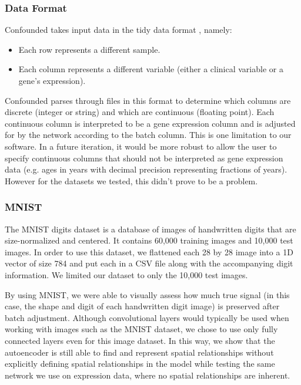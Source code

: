 \documentclass[notitlepage]{article}
\begin{document}
\subsubsection{Data Format}

Confounded takes input data in the tidy data format \cite{wickham_tidy_2014-1}, namely:

\begin{itemize}
	\item Each row represents a different sample.
	\item Each column represents a different variable (either a clinical variable or a gene's expression).
\end{itemize}

Confounded parses through files in this format to determine which columns are discrete (integer or string) and which are continuous (floating point).
Each continuous column is interpreted to be a gene expression column and is adjusted for by the network according to the batch column.
This is one limitation to our software.
In a future iteration, it would be more robust to allow the user to specify continuous columns that should not be interpreted as gene expression data (e.g. ages in years with decimal precision representing fractions of years).
However for the datasets we tested, this didn't prove to be a problem.

\subsubsection{MNIST}

The MNIST digits dataset \cite{lecun_mnist_nodate} is a database of images of handwritten digits that are size-normalized and centered.
It contains 60,000 training images and 10,000 test images.
In order to use this dataset, we flattened each 28 by 28 image into a 1D vector of size 784 and put each in a CSV file along with the accompanying digit information.
We limited our dataset to only the 10,000 test images.

By using MNIST, we were able to visually assess how much true signal (in this case, the shape and digit of each handwritten digit image) is preserved after batch adjustment.
Although convolutional layers would typically be used when working with images such as the MNIST dataset, we chose to use only fully connected layers even for this image dataset.
In this way, we show that the autoencoder is still able to find and represent spatial relationships without explicitly defining spatial relationships in the model while testing the same network we use on expression data, where no spatial relationships are inherent.
\end{document}
